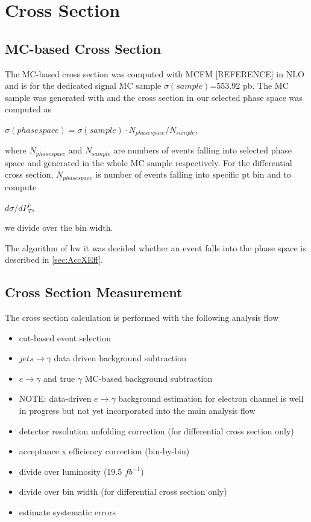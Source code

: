 \section{Cross Section}
\label{sec:CrossSection}
\subsection {MC-based Cross Section}

The MC-based cross section was computed with MCFM [REFERENCE] in NLO and is for the dedicated signal MC sample $\sigma(sample)$=553.92 pb. The MC sample was generated with \MADGRAPH [REFERENCE] and the cross section in our selected phase space was computed as 

\begin{center}
$\sigma(phase space) = \sigma(sample) \cdot N_{phase space} / N_{sample}$, 
\end{center} 

where  $N_{phase space}$ and $N_{sample}$ are numbers of events falling into selected phase space and generated in the whole MC sample respectively. For the differential cross section, $N_{phase space}$ is number of events falling into specific pt bin and to compute 

\begin{center}
$d\sigma / dP_T^{\gamma}$, 
\end{center} 

we divide over the bin width.

The algorithm of hw it was decided whether an event falls into the phase space is described in \ref{sec:AccXEff}.

\subsection {Cross Section Measurement}

The cross section calculation is performed with the following analysis flow

\begin{itemize}
  \item cut-based  event selection
  \item $jets \rightarrow \gamma$ data driven background subtraction
  \item $e \rightarrow \gamma $ and true $\gamma$ MC-based background subtraction
  \item NOTE: data-driven $e \rightarrow \gamma$ background estimation for electron channel is well in progress but not yet incorporated into the main analysis flow
  \item detector resolution unfolding correction (for differential cross section only)
  \item acceptance x efficiency correction (bin-by-bin)
  \item divide over luminosity (19.5 $fb^{-1}$)
  \item divide over bin width (for differential cross section only)
  \item estimate systematic errors
\end{itemize}

